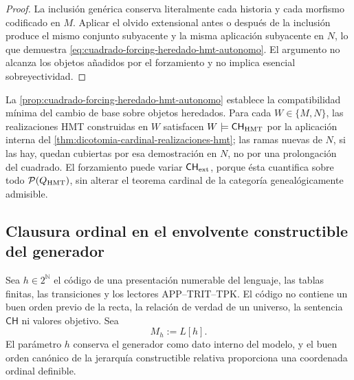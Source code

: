 \begin{proof}
La inclusión genérica conserva literalmente cada historia y cada morfismo
codificado en \(M\). Aplicar el olvido extensional antes o después de la
inclusión produce el mismo conjunto subyacente y la misma aplicación
subyacente en \(N\), lo que demuestra
\eqref{eq:cuadrado-forcing-heredado-hmt-autonomo}. El argumento no alcanza
los objetos añadidos por el forzamiento y no implica esencial
sobreyectividad.
\end{proof}

La \cref{prop:cuadrado-forcing-heredado-hmt-autonomo} establece la
compatibilidad mínima del cambio de base sobre objetos heredados. Para cada
\(W\in\{M,N\}\), las realizaciones HMT construidas en
\(W\) satisfacen \(W\models\mathsf{CH}_{\rm HMT}\) por la aplicación
interna del \cref{thm:dicotomia-cardinal-realizaciones-hmt}; las ramas nuevas
de \(N\), si las hay, quedan cubiertas por esa demostración en \(N\), no por
una prolongación del cuadrado. El forzamiento puede variar
\(\mathsf{CH}_{\rm ext}\), porque ésta cuantifica sobre todo
\(\mathcal P(Q_{\rm HMT})\), sin alterar el teorema cardinal de la categoría
genealógicamente admisible.

\subsection{Clausura ordinal en el envolvente constructible del generador}

Sea \(h\in2^{\mathbb N}\) el código de una presentación numerable del
lenguaje, las tablas finitas, las transiciones y los lectores
APP--TRIT--TPK. El código no contiene un buen orden previo de la recta, la
relación de verdad de un universo, la sentencia \(\mathsf{CH}\) ni valores
objetivo. Sea
\begin{equation}
 M_h:=L[h].
 \label{eq:envolvente-constructible-generador}
\end{equation}
El parámetro \(h\) conserva el generador como dato interno del modelo, y el
buen orden canónico de la jerarquía constructible relativa proporciona una
coordenada ordinal definible.

